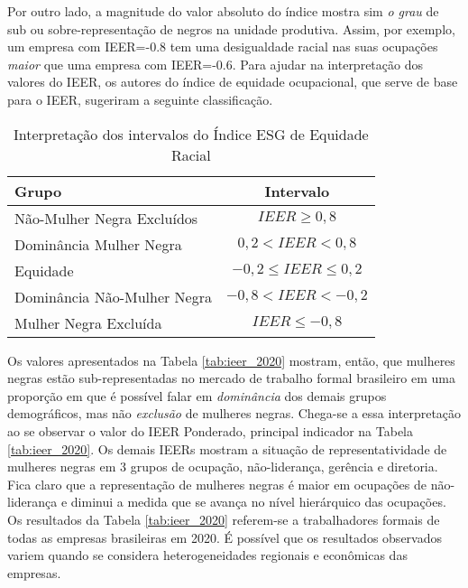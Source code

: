 \documentclass[12pt]{article}
\begin{document}
\par Por outro lado, a magnitude do valor absoluto do índice mostra sim \textit{o grau} de sub ou sobre-representação de negros na unidade produtiva. Assim, por exemplo, um empresa com IEER=-0.8 tem uma desigualdade racial nas suas ocupações \textit{maior} que uma empresa com IEER=-0.6. Para ajudar na interpretação dos valores do IEER, os autores do índice de equidade ocupacional, que serve de base para o IEER, sugeriram a seguinte classificação.\autocite{ransom2001one}

\begin{table}[htb!]
\centering
\caption{Interpretação dos intervalos do Índice ESG de Equidade Racial}
\begin{tabular}{lc}
\hline
Grupo             & Intervalo                 \\ \hline
Não-Mulher Negra Excluídos & $IEER \geq 0, 8 $               \\
Dominância Mulher Negra  & $0,2 < IEER < 0,8$   \\
Equidade          & $-0,2\leq IEER \leq 0,2$  \\
Dominância Não-Mulher Negra & $-0,8 < IEER < -0,2$ \\
Mulher Negra Excluída  & $IEER \leq -0,8$        \\ \hline
\end{tabular}
\end{table}

\par Os valores apresentados na Tabela \ref{tab:ieer_2020} mostram, então, que mulheres negras estão sub-representadas no mercado de trabalho formal brasileiro em uma proporção em que é possível falar em \textit{dominância} dos demais grupos de\-mo\-grá\-fi\-cos, mas não \textit{exclusão} de mulheres negras. Chega-se a essa interpretação ao se observar o valor do IEER Ponderado, principal indicador na Tabela \ref{tab:ieer_2020}. Os demais IEERs mostram a situação de representatividade de mulheres negras em 3 grupos de ocupação, não-liderança, gerência e diretoria. Fica claro que a representação de mulheres negras é maior em ocupações de não-liderança e diminui a medida que se avança no nível hierárquico das ocupações. Os resultados da Tabela \ref{tab:ieer_2020} referem-se a trabalhadores formais de todas as empresas brasileiras em 2020. É possível que os resultados observados variem quando se considera heterogeneidades regionais e econômicas das empresas.


\end{document}
